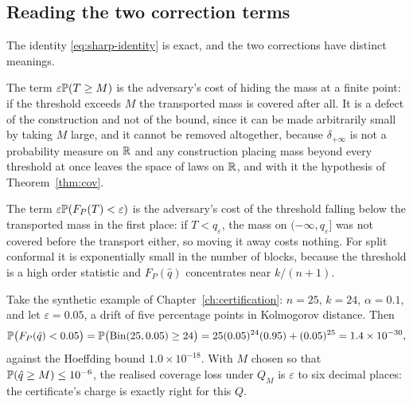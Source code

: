 \documentclass[../../../main.tex]{subfiles}
\begin{document}
\subsection{Reading the two correction terms}

The identity \eqref{eq:sharp-identity} is exact, and the two corrections have distinct meanings.

The term $\varepsilon\mathbb{P}(T\ge M)$ is the adversary's cost of hiding the mass at a finite point: if the threshold exceeds $M$ the transported mass is covered after all. It is a defect of the construction and not of the bound, since it can be made arbitrarily small by taking $M$ large, and it cannot be removed altogether, because $\delta_{+\infty}$ is not a probability measure on $\mathbb{R}$ and any construction placing mass beyond every threshold at once leaves the space of laws on $\mathbb{R}$, and with it the hypothesis of Theorem~\ref{thm:cov}.

The term $\varepsilon\mathbb{P}(F_P(T)<\varepsilon)$ is the adversary's cost of the threshold falling below the transported mass in the first place: if $T<q_\varepsilon$, the mass on $(-\infty,q_\varepsilon]$ was not covered before the transport either, so moving it away costs nothing. For split conformal it is exponentially small in the number of blocks, because the threshold is a high order statistic and $F_P(\hat q)$ concentrates near $k/(n+1)$.

\begin{example}\label{ex:sharp-corr}
Take the synthetic example of Chapter~\ref{ch:certification}: $n=25$, $k=24$, $\alpha=0.1$, and let $\varepsilon=0.05$, a drift of five percentage points in Kolmogorov distance. Then
\[
\mathbb{P}\big(F_P(\hat q)<0.05\big)=\mathbb{P}\big(\mathrm{Bin}(25,0.05)\ge24\big)=25(0.05)^{24}(0.95)+(0.05)^{25}=1.4\times10^{-30},
\]
against the Hoeffding bound $1.0\times10^{-18}$. With $M$ chosen so that $\mathbb{P}(\hat q\ge M)\le10^{-6}$, the realised coverage loss under $Q_M$ is $\varepsilon$ to six decimal places: the certificate's charge is exactly right for this $Q$.
\end{example}

\end{document}
